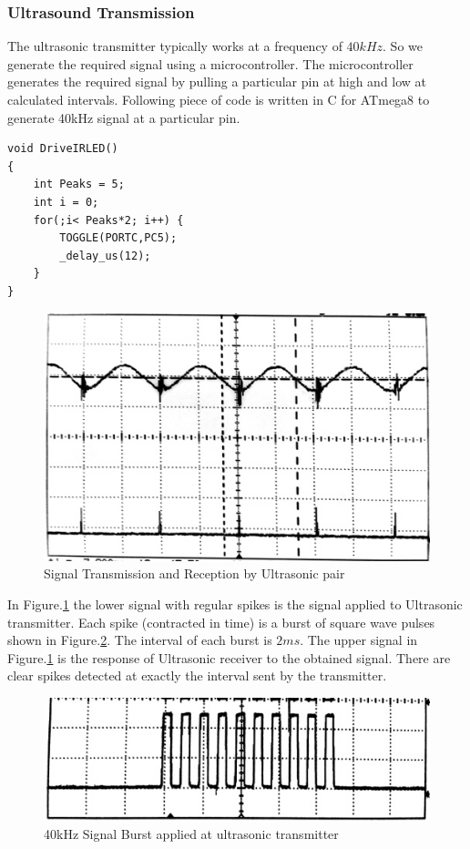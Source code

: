\subsubsection{Ultrasound Transmission}
The ultrasonic transmitter typically works at a frequency of $40kHz$. So we generate the required signal using  a microcontroller. The microcontroller generates the required signal by pulling a particular pin at high and low at calculated intervals. Following piece of code is written in C for ATmega8 to generate 40kHz signal at a particular pin.

\begin{lstlisting}
void DriveIRLED()
{
	int Peaks = 5;
	int i = 0;
	for(;i< Peaks*2; i++) {
		TOGGLE(PORTC,PC5);
		_delay_us(12);
	}
}
\end{lstlisting}

\begin{figure}
	\centering
	\includegraphics[width=120mm]{Images/UltrasonicTransception.jpg}
	\caption{Signal Transmission and Reception by Ultrasonic pair}
	\label{fig:UltrasonicTransception}
\end{figure}
In Figure.\ref{fig:UltrasonicTransception} the lower signal with regular spikes is the signal applied to Ultrasonic transmitter. Each spike (contracted in time) is a burst of square wave pulses shown in Figure.\ref{fig:SignalBrust}. The interval of each burst is $2ms$. The upper signal in Figure.\ref{fig:UltrasonicTransception} is the response of Ultrasonic receiver to the obtained signal. There are clear spikes  detected at exactly the interval sent by the transmitter.
\begin{figure}
	\centering
	\includegraphics[width=120mm]{Images/SignalBrust.jpg}
	\caption{40kHz Signal Burst applied at ultrasonic transmitter}
	\label{fig:SignalBrust}
\end{figure}
 
